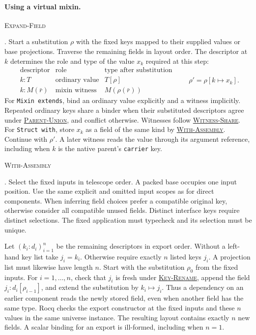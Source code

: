 \documentclass{article}
\newcommand{\ttt}[1]{\texttt{#1}}
\newcommand{\rdefn}[1]{\hypertarget{rule-#1}{\textsc{#1}}}
\newcommand{\ruse}[1]{\hyperlink{rule-#1}{\textsc{#1}}}
\begin{document}
\paragraph{Using a virtual mixin.}
\rdefn{Expand-Field}. Start a substitution $\rho$ with the fixed keys
mapped to their supplied values or base projections. Traverse the remaining
fields in layout order. The descriptor at $k$ determines the role and type
of the value $x_k$ required at this step:
\[
\begin{array}{c|c|c}
 \text{descriptor} & \text{role} & \text{type after substitution}\\ \hline
 k:T & \text{ordinary value} & T[\rho]\\
 k:M(\bar r) & \text{mixin witness} & M(\rho(\bar r))
\end{array}
\qquad \rho'=\rho[k\mapsto x_k].
\]
For \ttt{Mixin extends}, bind an ordinary value explicitly and a witness
implicitly. Repeated ordinary keys share a binder when their substituted
descriptors agree under \ruse{Parent-Union}, and conflict otherwise.
Witnesses follow \ruse{Witness-Share}. For \ttt{Struct with}, store $x_k$ as a field of the same kind by \ruse{With-Assembly}. Continue
with $\rho'$. A later witness reads the value through its argument
reference, including when $k$ is the native parent's \ttt{carrier} key.

\rdefn{With-Assembly}. Select the fixed inputs in telescope order.
A packed base occupies one input position. Use the same explicit and
omitted input scopes as for direct components. When inferring field
choices prefer a compatible original key, otherwise consider all
compatible unused fields. Distinct interface keys require distinct
selections. The fixed application must typecheck and its selection
must be unique.

Let $(k_i:d_i)_{i=1}^n$ be the remaining descriptors in export order.
Without a left-hand key list take $j_i=k_i$. Otherwise require exactly
$n$ listed keys $j_i$. A projection list must likewise have length $n$.
Start with the substitution $\rho_0$ from the fixed inputs. For
$i=1,\ldots,n$, check that $j_i$ is fresh under \ruse{Key-Rename},
append the field $j_i:d_i[\rho_{i-1}]$, and extend the substitution
by $k_i\mapsto j_i$. Thus a dependency on an earlier component reads
the newly stored field, even when another field has the same type.
Rocq checks the export constructor at the fixed inputs and these $n$
values in the same universe instance. The resulting layout contains
exactly $n$ new fields. A scalar binding for an export is ill-formed,
including when $n=1$.
\end{document}

